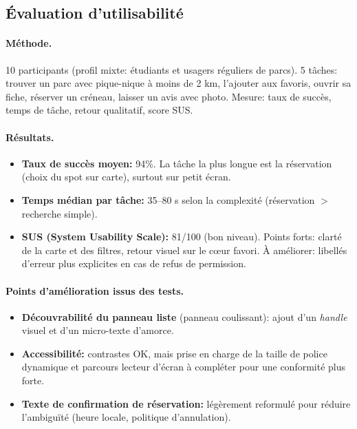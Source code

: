 \documentclass[12pt,a4paper]{article}
\begin{document}
\subsection{Évaluation d’utilisabilité}

\paragraph{Méthode.}
10 participants (profil mixte: étudiants et usagers réguliers de parcs). 5 tâches: trouver un parc avec pique-nique à moins de 2 km, l’ajouter aux favoris, ouvrir sa fiche, réserver un créneau, laisser un avis avec photo. Mesure: taux de succès, temps de tâche, retour qualitatif, score SUS.

\paragraph{Résultats.}
\begin{itemize}
  \item \textbf{Taux de succès moyen:} 94\%. La tâche la plus longue est la réservation (choix du spot sur carte), surtout sur petit écran.
  \item \textbf{Temps médian par tâche:} 35--80 s selon la complexité (réservation \(>\) recherche simple).
  \item \textbf{SUS (System Usability Scale):} 81/100 (bon niveau). Points forts: clarté de la carte et des filtres, retour visuel sur le cœur favori. À améliorer: libellés d’erreur plus explicites en cas de refus de permission.
\end{itemize}

\paragraph{Points d’amélioration issus des tests.}
\begin{itemize}
  \item \textbf{Découvrabilité du panneau liste} (panneau coulissant): ajout d’un \emph{handle} visuel et d’un micro-texte d’amorce.
  \item \textbf{Accessibilité:} contrastes OK, mais prise en charge de la taille de police dynamique et parcours lecteur d’écran à compléter pour une conformité plus forte.
  \item \textbf{Texte de confirmation de réservation:} légèrement reformulé pour réduire l’ambiguïté (heure locale, politique d’annulation).
\end{itemize}
\end{document}

